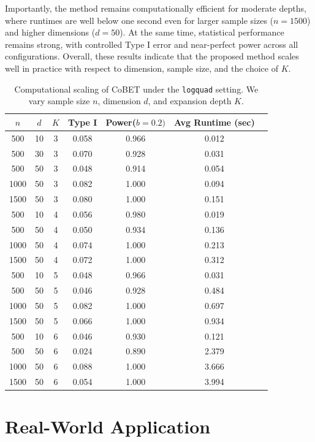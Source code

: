 \documentclass[12pt,reqno,oneside]{amsbook}
\theoremstyle{definition}
\theoremstyle{remark}
\begin{document}
Importantly, the method remains computationally efficient for moderate depths, where runtimes are well below one second even for larger sample sizes ($n=1500$) and higher dimensions ($d=50$). At the same time, statistical performance remains strong, with controlled Type I error and near-perfect power across all configurations.
Overall, these results indicate that the proposed method scales well in practice with respect to dimension, sample size, and the choice of $K$. 

\begin{table}[ht]
\centering
\small
\begin{tabular}{ccccccc}
\toprule
$n$ & $d$ & $K$ & Type I & Power($b=0.2)$ & Avg Runtime (sec) \\
\midrule
500  & 10 & 3 & 0.058 & 0.966 & 0.012 \\
500  & 30 & 3 & 0.070 & 0.928 & 0.031 \\
500  & 50 & 3 & 0.048 & 0.914 & 0.054 \\
1000 & 50 & 3 & 0.082 & 1.000 & 0.094 \\
1500 & 50 & 3 & 0.080 & 1.000 & 0.151 \\
\midrule
500  & 10 & 4 & 0.056 & 0.980 & 0.019 \\
500  & 50 & 4 & 0.050 & 0.934 & 0.136 \\
1000 & 50 & 4 & 0.074 & 1.000 & 0.213 \\
1500 & 50 & 4 & 0.072 & 1.000 & 0.312 \\
\midrule
500  & 10 & 5 & 0.048 & 0.966 & 0.031 \\
500  & 50 & 5 & 0.046 & 0.928 & 0.484 \\
1000 & 50 & 5 & 0.082 & 1.000 & 0.697 \\
1500 & 50 & 5 & 0.066 & 1.000 & 0.934 \\
\midrule
500  & 10 & 6 & 0.046 & 0.930 & 0.121 \\
500  & 50 & 6 & 0.024 & 0.890 & 2.379 \\
1000 & 50 & 6 & 0.088 & 1.000 & 3.666 \\
1500 & 50 & 6 & 0.054 & 1.000 & 3.994 \\
\bottomrule
\end{tabular}
\caption{Computational scaling of CoBET under the \texttt{logquad} setting. We vary sample size $n$, dimension $d$, and expansion depth $K$.}
\label{tab:computational_scaling}
\end{table}

\section{Real-World Application}
\label{sec:example}
\end{document}
